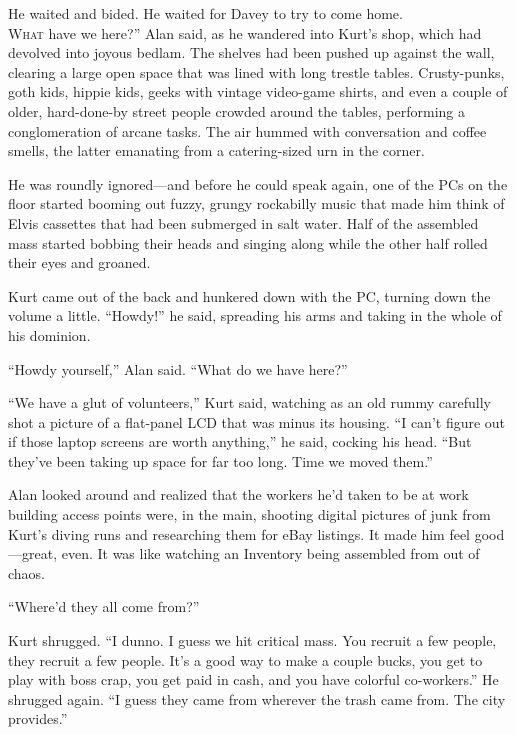 \documentclass{article}
\begin{document}
He waited and bided.  He waited for Davey to try to come home.
\\
\lettrine[lines=3, lhang=.5, nindent=0pt, findent=2pt]{W}{hat}
have we here?'' Alan said, as he wandered into Kurt's shop,
which had devolved into joyous bedlam.  The shelves had been pushed up
against the wall, clearing a large open space that was lined with long
trestle tables.  Crusty-punks, goth kids, hippie kids, geeks with
vintage video-game shirts, and even a couple of older, hard-done-by
street people crowded around the tables, performing a conglomeration
of arcane tasks.  The air hummed with conversation and coffee smells,
the latter emanating from a catering-sized urn in the corner.

He was roundly ignored---and before he could speak again, one of the
PCs on the floor started booming out fuzzy, grungy rockabilly music
that made him think of Elvis cassettes that had been submerged in salt
water.  Half of the assembled mass started bobbing their heads and
singing along while the other half rolled their eyes and groaned.

Kurt came out of the back and hunkered down with the PC, turning down
the volume a little.  ``Howdy!'' he said, spreading his arms and
taking in the whole of his dominion.

``Howdy yourself,'' Alan said.  ``What do we have here?''

``We have a glut of volunteers,'' Kurt said, watching as an old rummy
carefully shot a picture of a flat-panel LCD that was minus its
housing.  ``I can't figure out if those laptop screens are worth
anything,'' he said, cocking his head.  ``But they've been taking up
space for far too long.  Time we moved them.''

Alan looked around and realized that the workers he'd taken to be at
work building access points were, in the main, shooting digital
pictures of junk from Kurt's diving runs and researching them for eBay
listings.  It made him feel good---great, even.  It was like watching
an Inventory being assembled from out of chaos.

``Where'd they all come from?''

Kurt shrugged.  ``I dunno.  I guess we hit critical mass.  You recruit
a few people, they recruit a few people.  It's a good way to make a
couple bucks, you get to play with boss crap, you get paid in cash,
and you have colorful co-workers.'' He shrugged again.  ``I guess they
came from wherever the trash came from.  The city provides.''
\end{document}
